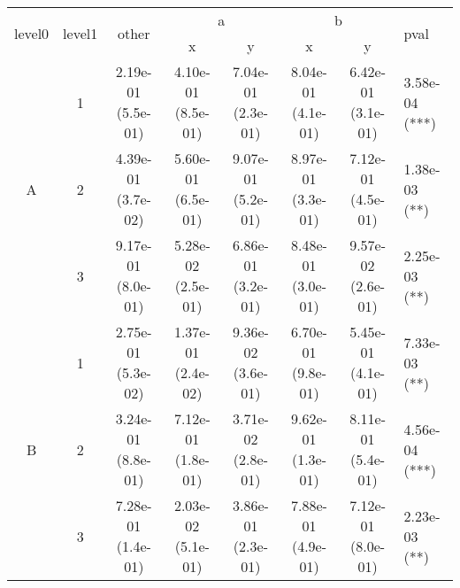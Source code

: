 \begin{tabular}{cccccccl}
\toprule
\multirow{2}{*}{level0} & \multirow{2}{*}{level1}& \multirow{2}{*}{other}&\multicolumn{2}{c}{a}&\multicolumn{2}{c}{b}& \multirow{2}{*}{pval}\tabularnewline
\cmidrule(lr){4-5}
\cmidrule(lr){6-7}
&&&x&y&x&y\tabularnewline
\midrule
\multirow{3}{*}{A}&1& 2.19e-01 (5.5e-01)& 4.10e-01 (8.5e-01)& 7.04e-01 (2.3e-01)& 8.04e-01 (4.1e-01)& 6.42e-01 (3.1e-01)& 3.58e-04 (***)\tabularnewline
&2& 4.39e-01 (3.7e-02)& 5.60e-01 (6.5e-01)& 9.07e-01 (5.2e-01)& 8.97e-01 (3.3e-01)& 7.12e-01 (4.5e-01)& 1.38e-03 (**)\tabularnewline
&3& 9.17e-01 (8.0e-01)& 5.28e-02 (2.5e-01)& 6.86e-01 (3.2e-01)& 8.48e-01 (3.0e-01)& 9.57e-02 (2.6e-01)& 2.25e-03 (**)\tabularnewline
\midrule
\multirow{3}{*}{B}&1& 2.75e-01 (5.3e-02)& 1.37e-01 (2.4e-02)& 9.36e-02 (3.6e-01)& 6.70e-01 (9.8e-01)& 5.45e-01 (4.1e-01)& 7.33e-03 (**)\tabularnewline
&2& 3.24e-01 (8.8e-01)& 7.12e-01 (1.8e-01)& 3.71e-02 (2.8e-01)& 9.62e-01 (1.3e-01)& 8.11e-01 (5.4e-01)& 4.56e-04 (***)\tabularnewline
&3& 7.28e-01 (1.4e-01)& 2.03e-02 (5.1e-01)& 3.86e-01 (2.3e-01)& 7.88e-01 (4.9e-01)& 7.12e-01 (8.0e-01)& 2.23e-03 (**)\tabularnewline
\bottomrule
\end{tabular}
